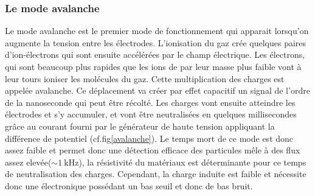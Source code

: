 \subsubsection{Le mode avalanche}
Le mode avalanche est le premier mode de fonctionnement qui apparait lorsqu'on augmente la tension entre les électrodes. L'ionisation du gaz crée quelques paires d'ion-électrons qui sont ensuite accélérées par le champ électrique. Les électrons, qui sont beaucoup plus rapides que les ions de par leur masse plus faible vont à leur tours ioniser les molécules du gaz. Cette multiplication des charges est appelée avalanche. Ce déplacement va créer par effet capacitif un signal de l'ordre de la nanoseconde qui peut être récolté. Les charges vont ensuite atteindre les électrodes et s'y accumuler, et vont être neutralisées en quelques millisecondes grâce au courant fourni par le générateur de haute tension appliquant la différence de potentiel (cf.fig\ref{avalanche}). Le temps mort de ce mode est donc assez faible et permet donc une détection efficace des particules mêle à des flux assez elevée($\sim\SI{1}{\kilo\hertz}$), la résistivité du matériaux est déterminante pour ce temps de neutralisation des charges. Cependant, la charge induite est faible et nécessite donc une électronique possédant un bas seuil et donc de bas bruit.


